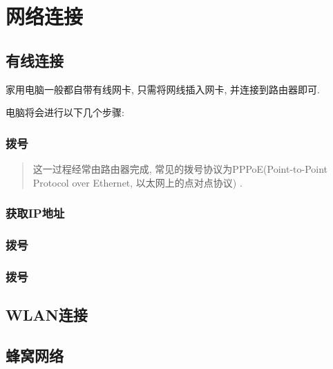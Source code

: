 \chapter{网络连接}

\section{有线连接}

家用电脑一般都自带有线网卡, 只需将网线插入网卡, 并连接到路由器即可. 

电脑将会进行以下几个步骤:

\subsection{拨号}

\begin{quote}
    这一过程经常由路由器完成, 常见的拨号协议为PPPoE(Point-to-Point Protocol over Ethernet, 以太网上的点对点协议) .
\end{quote}



\subsection{获取IP地址}


\subsection{拨号}


\subsection{拨号}


\section{WLAN连接}


\section{蜂窝网络}


\endinput